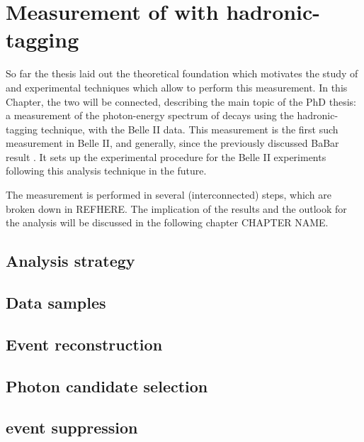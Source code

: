 \chapter{Measurement of \safeBtoXsgamma with hadronic-tagging}

So far the thesis laid out the theoretical foundation which motivates the study of \BtoXsgamma 
and experimental techniques which allow to perform this measurement.
In this Chapter, the two will be connected, describing the main topic of the PhD thesis: 
a measurement of the photon-energy spectrum of \BtoXsgamma decays using the hadronic-tagging technique,
with the Belle II data.
This measurement is the first such measurement in Belle II, and generally, since the previously discussed BaBar result \cite{BaBar:2007yhb}.
It sets up the experimental procedure for the Belle II experiments following this analysis technique in the future.

The measurement is performed in several (interconnected) steps, which are broken down in REFHERE.
The implication of the results and the outlook for the analysis will be discussed in the following chapter CHAPTER NAME.


\section{Analysis strategy}\label{sec:analysis_strategy}


\section{Data samples}\label{sec:data_samples}


\section{Event reconstruction}\label{sec:event_reconstruction}


\section{Photon candidate selection}\label{sec:photon_selection}


\section{\texorpdfstring{\MakeLowercase{\epem\ra\qqbar}}{e+e-->qqbar} event suppression}\label{sec:continuum_suppression}



